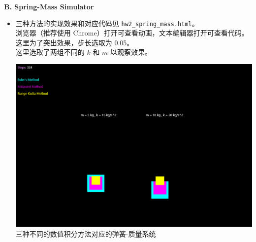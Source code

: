\documentclass[a4paper, 12pt]{article}
\begin{document}
\textbf{B. Spring-Mass Simulator}

\begin{itemize}[leftmargin=2em, label={}]

\item 三种方法的实现效果和对应代码见 \texttt{hw2\_spring\_mass.html}。\\
浏览器（推荐使用 Chrome）打开可查看动画，文本编辑器打开可查看代码。\\
这里为了突出效果，步长选取为 0.05。\\
这里选取了两组不同的 $k$ 和 $m$ 以观察效果。

\begin{center}
\includegraphics[width=\textwidth]{images/spring_mass.png}\\
三种不同的数值积分方法对应的弹簧-质量系统
\end{center}


\end{itemize}
\end{document}
